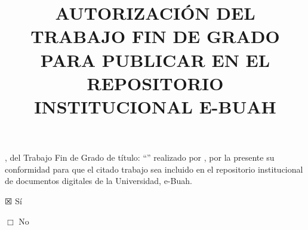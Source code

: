 %

\title{AUTORIZACIÓN \MakeUppercase{\wordDelOrDeLos{} \wordTutorOrTutores} DEL TRABAJO FIN DE GRADO PARA PUBLICAR EN
  EL REPOSITORIO INSTITUCIONAL E-BUAH}             %
\date{}                                            %


{\Large
\maketitle 

\thispagestyle{empty}

\vspace{1cm}

\myAdvisorsWithDonOrDona, \wordTutorOrTutores{} del Trabajo Fin de Grado de título:
``\myBookTitle'' realizado por \wordDonOrDonaAutor{} \myAuthorFullName, por la presente \wordDaOrDan{} su
conformidad para que el citado trabajo sea incluido en el repositorio
institucional de documentos digitales de la Universidad, e-Buah.

\vspace{1cm}

$\XBox$ Sí

\vspace{0.5cm}

$\Box$ No

\vspace{2cm}


\vspace{4cm}


}


